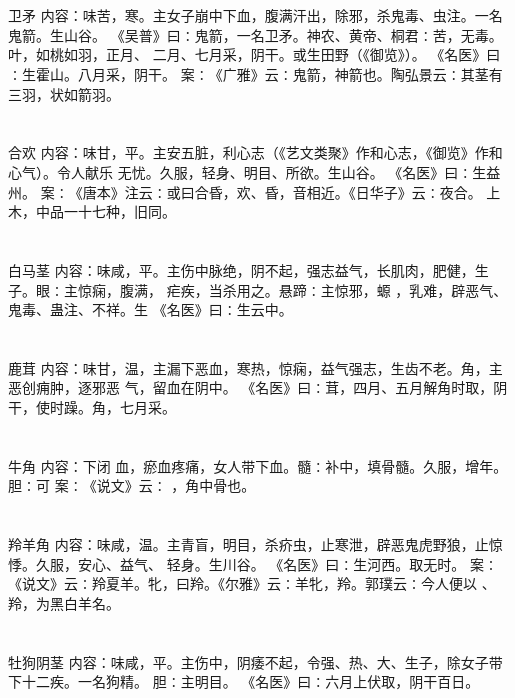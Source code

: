 \documentclass[12pt,UTF8]{ctexbook}
\begin{document}
\section{}卫矛
内容：味苦，寒。主女子崩中下血，腹满汗出，除邪，杀鬼毒、虫注。一名鬼箭。生山谷。 
《吴普》曰∶鬼箭，一名卫矛。神农、黄帝、桐君∶苦，无毒。叶，如桃如羽，正月、 
二月、七月采，阴干。或生田野（《御览》）。 
《名医》曰∶生霍山。八月采，阴干。 
案∶《广雅》云∶鬼箭，神箭也。陶弘景云∶其茎有三羽，状如箭羽。 


\section{}合欢
内容：味甘，平。主安五脏，利心志（《艺文类聚》作和心志，《御览》作和心气）。令人献乐 
无忧。久服，轻身、明目、所欲。生山谷。 
《名医》曰∶生益州。 
案∶《唐本》注云∶或曰合昏，欢、昏，音相近。《日华子》云∶夜合。 
上木，中品一十七种，旧同。 


\section{}白马茎
内容：味咸，平。主伤中脉绝，阴不起，强志益气，长肌肉，肥健，生子。眼∶主惊痫，腹满， 
疟疾，当杀用之。悬蹄∶主惊邪，螈 ，乳难，辟恶气、鬼毒、蛊注、不祥。生 
《名医》曰∶生云中。 


\section{}鹿茸
内容：味甘，温，主漏下恶血，寒热，惊痫，益气强志，生齿不老。角，主恶创痈肿，逐邪恶 
气，留血在阴中。 
《名医》曰∶茸，四月、五月解角时取，阴干，使时躁。角，七月采。 


\section{}牛角
内容：下闭 
血，瘀血疼痛，女人带下血。髓∶补中，填骨髓。久服，增年。胆∶可 
案∶《说文》云∶ ，角中骨也。 


\section{}羚羊角
内容：味咸，温。主青盲，明目，杀疥虫，止寒泄，辟恶鬼虎野狼，止惊悸。久服，安心、益气、 
轻身。生川谷。 
《名医》曰∶生河西。取无时。 
案∶《说文》云∶羚夏羊。牝，曰羚。《尔雅》云∶羊牝，羚。郭璞云∶今人便以 、 
羚，为黑白羊名。 


\section{}牡狗阴茎
内容：味咸，平。主伤中，阴痿不起，令强、热、大、生子，除女子带下十二疾。一名狗精。 
胆∶主明目。 
《名医》曰∶六月上伏取，阴干百日。 
\end{document}
